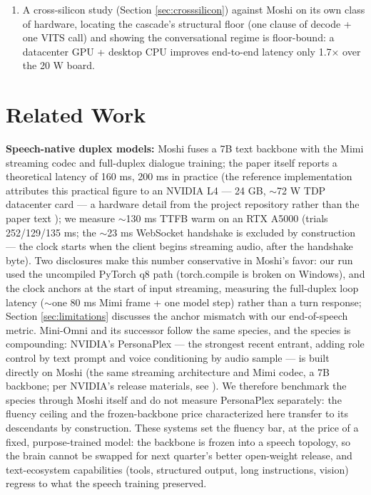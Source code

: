 \documentclass{article}
\begin{document}
\begin{enumerate}
	\item A cross-silicon study (Section \ref{sec:crosssilicon}) against Moshi on its own class of hardware, locating the cascade's structural floor (one clause of decode + one VITS call) and showing the conversational regime is floor-bound: a datacenter GPU + desktop CPU improves end-to-end latency only 1.7× over the 20 W board.
\end{enumerate}

\section{Related Work}

\textbf{Speech-native duplex models:} Moshi \citep{defossez2024moshi} fuses a 7B text backbone with the Mimi streaming codec and full-duplex dialogue training; the paper itself reports a theoretical latency of 160 ms, 200 ms in practice \citep{defossez2024moshi} (the reference implementation attributes this practical figure to an NVIDIA L4 --- 24 GB, $\sim$72 W TDP datacenter card --- a hardware detail from the project repository rather than the paper text \citep{kyutai2024moshirepo,nvidial4}); we measure $\sim$130 ms TTFB warm on an RTX A5000 (trials 252/129/135 ms; the $\sim$23 ms WebSocket handshake is excluded by construction --- the clock starts when the client begins streaming audio, after the handshake byte). Two disclosures make this number conservative in Moshi's favor: our run used the uncompiled PyTorch q8 path (torch.compile is broken on Windows), and the clock anchors at the start of input streaming, measuring the full-duplex loop latency ($\sim$one 80 ms Mimi frame + one model step) rather than a turn response; Section \ref{sec:limitations} discusses the anchor mismatch with our end-of-speech metric. Mini-Omni and its successor \citep{xie2024miniomni,xie2024miniomni2} follow the same species, and the species is compounding: NVIDIA's PersonaPlex \citep{roy2026personaplex} --- the strongest recent entrant, adding role control by text prompt and voice conditioning by audio sample --- is built directly on Moshi (the same streaming architecture and Mimi codec, a 7B backbone; per NVIDIA's release materials, see \citep{roy2026personaplex}). We therefore benchmark the species through Moshi itself and do not measure PersonaPlex separately: the fluency ceiling and the frozen-backbone price characterized here transfer to its descendants by construction. These systems set the fluency bar, at the price of a fixed, purpose-trained model: the backbone is frozen into a speech topology, so the brain cannot be swapped for next quarter's better open-weight release, and text-ecosystem capabilities (tools, structured output, long instructions, vision) regress to what the speech training preserved.
\end{document}
